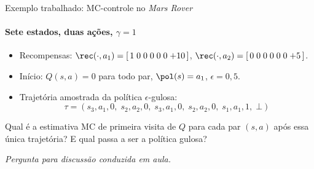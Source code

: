 \documentclass[aspectratio=169, 11pt]{beamer}
\newcommand{\paradiscussao}{\smallskip
  {\footnotesize\color{rlCinza}\itshape Pergunta para discussão conduzida em aula.}}
\begin{document}
\begin{frame}{Exemplo trabalhado: MC-controle no \emph{Mars Rover}}
  \framesubtitle{Sete estados, duas ações, $\gamma = 1$}

  \begin{center}\end{center}

  \smallskip
  \begin{itemize}\setlength{\itemsep}{0.25ex}
    \item Recompensas: $\rec(\cdot, a_1) = [\,1\;0\;0\;0\;0\;0\;{+}10\,]$,\quad
      $\rec(\cdot, a_2) = [\,0\;0\;0\;0\;0\;0\;{+}5\,]$.
    \item Início: $Q(s,a) = 0$ para todo par, $\pol(s) = a_1$, $\epsilon = 0{,}5$.
    \item Trajetória amostrada da política $\epsilon$-gulosa:
      \[ \tau = (s_3, a_1, 0,\; s_2, a_2, 0,\; s_3, a_1, 0,\; s_2, a_2, 0,\; s_1, a_1, 1,\; \bot) \]
  \end{itemize}

  \begin{quizbox}{}
    Qual é a estimativa MC de primeira visita de $Q$ para cada par
    $(s,a)$ após essa única trajetória? E qual passa a ser a política
    gulosa?
  \end{quizbox}
  \paradiscussao
\end{frame}
\end{document}
